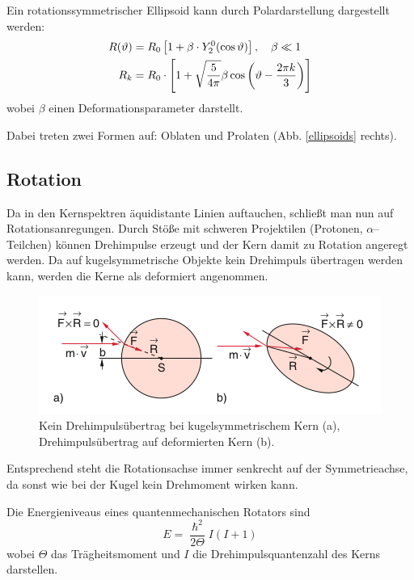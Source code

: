 \documentclass[Ex4_Zusammenfassung.tex]{subfiles}
\begin{document}
Ein rotationssymmetrischer Ellipsoid kann durch Polardarstellung dargestellt werden:
\begin{align}
	R(\vartheta) &= R_0 \left[ 1 + \beta \cdot Y_2^0 (\cos \vartheta ) \right], \quad \beta \ll 1\\
	R_k &= R_0 \cdot \left[ 1 + \sqrt{\frac{5}{4\pi}} \beta \cos\left( \vartheta - \frac{2 \pi k}{3}\right)  \right]
\end{align}
wobei $\beta$ einen Deformationsparameter darstellt. 

Dabei treten zwei Formen auf: Oblaten und Prolaten (Abb. \ref{ellipsoids} rechts). 

\subsection{Rotation}
Da in den Kernspektren äquidistante Linien auftauchen, schließt man nun auf Rotationsanregungen. Durch Stöße mit schweren Projektilen (Protonen, $\alpha$--Teilchen) können Drehimpulse erzeugt und der Kern damit zu Rotation angeregt werden. Da auf kugelsymmetrische Objekte kein Drehimpuls übertragen werden kann, werden die Kerne als deformiert angenommen. 
\begin{figure}[h]
	\centering
	\includegraphics[scale=0.4]{deformiert.png}
	\caption{Kein Drehimpulsübertrag bei kugelsymmetrischem Kern (a), Drehimpulsübertrag auf deformierten Kern (b).}
\end{figure}
Entsprechend steht die Rotationsachse immer senkrecht auf der Symmetrieachse, da sonst wie bei der Kugel kein Drehmoment wirken kann. 

Die Energieniveaus eines quantenmechanischen Rotators sind
\begin{equation}
	E = \frac{\hslash^2}{2 \Theta} I (I+1)
\end{equation}
wobei $\Theta$ das Trägheitsmoment und $I$ die Drehimpulsquantenzahl des Kerns darstellen. 
\end{document}
